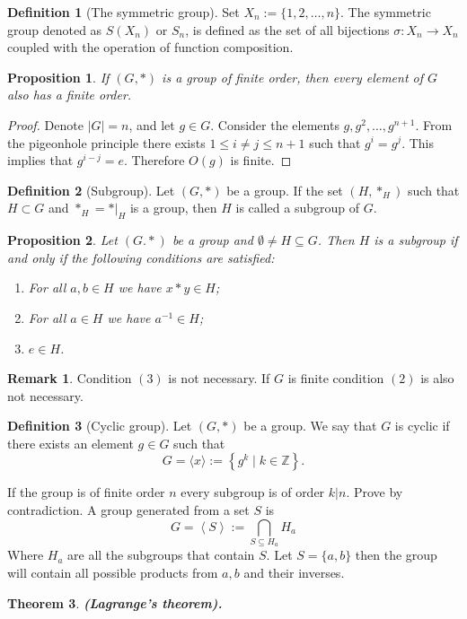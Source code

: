 \documentclass[11pt,a4paper]{article}
\theoremstyle{definition}
\newtheorem{definition}{Definition}[section]
\newtheorem{remark}{Remark}[section]
\theoremstyle{plain}
\newtheorem{theorem}{Theorem}[section]
\newtheorem{proposition}[theorem]{Proposition}
\newcommand{\Z}{\mathbb{Z}}
\newcommand{\set}[2]{ \left\{ #1 \mid #2 \right\} }
\renewcommand{\tt}[1]{\textnormal{\textbf{(#1).}}} %
\begin{document}
  \begin{definition}[The symmetric group]
    Set $X_n := \{1,2,\dots,n\}$. 
	  The symmetric group denoted as $S(X_n)$ or $S_n$, is defined as the set 
    of all bijections $\sigma \colon X_n \to X_n$ coupled with the operation 
    of function composition.
  \end{definition}

  \begin{proposition}
    If $(G, *)$ is a group of finite order, then every element of $G$ also has
    a finite order.
  \end{proposition}
  \begin{proof}
    Denote $|G|=n$, and let $g \in G$.
    Consider the elements $g, g^2, \dots, g^{n+1}$.
    From the pigeonhole principle there exists $1 \le i \neq j \le n+1$
    such that $g^i = g^j$. This implies that $g^{i-j} = e$.
  	Therefore $O(g)$ is finite.
  \end{proof}

  \begin{definition}[Subgroup]
    Let $(G, *)$ be a group. If the set $(H,*_H)$ such that $H \subset G$
    and $*_H = *\vert_H$ is a group, then $H$ is called a subgroup of $G$.
  \end{definition}

  \begin{proposition}
    Let $(G.*)$ be a group and $\emptyset \neq H \subseteq G$.
    Then $H$ is a subgroup if and only if the following conditions are
    satisfied:
    \begin{enumerate}
      \item[(1)] For all $a,b \in H$ we have $x * y \in H$;
      \item[(2)] For all $a \in H$ we have $a^{-1} \in H$;
      \item[(3)] $e \in H$.
    \end{enumerate}
  \end{proposition}
  \begin{remark}
    Condition $(3)$ is not necessary.
    If $G$ is finite condition $(2)$ is also not necessary.
  \end{remark}

  \begin{definition}[Cyclic group]
    Let $(G,*)$ be a group. We say that $G$ is cyclic if there exists
    an element $g \in G$ such that
    \[
      G = \langle x \rangle := \set{g^k}{k \in \Z}.
    \]
  \end{definition}

  If the group is of finite order $n$ every subgroup is of order $k|n$.
  Prove by contradiction.
  A group generated from a set $S$ is
  \[
    G = \left<S\right> := \bigcap_{S \subseteq H_a}{H_a}
  \]
  Where $H_a$ are all the subgroups that contain $S$.
  Let $S = \{a,b\}$ then the group will contain all possible products 
  from $a,b$ and their inverses.

  \begin{theorem}\tt{Lagrange's theorem}
  \end{theorem}
  
\end{document}
